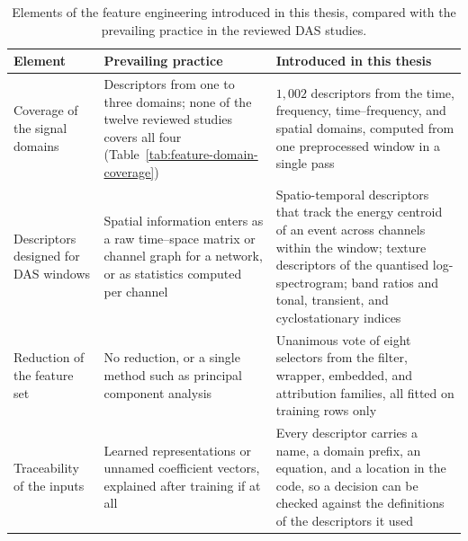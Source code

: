 \begin{table}[!htbp]
	\centering
	\caption{Elements of the feature engineering introduced in this thesis, compared with the prevailing practice in the reviewed DAS studies.}
	\label{tab:novelty}
	\footnotesize
	\setlength{\tabcolsep}{4pt}
	\renewcommand{\arraystretch}{1.2}
	\begin{tabularx}{\textwidth}{@{}>{\raggedright\arraybackslash}p{3.0cm} >{\raggedright\arraybackslash}X >{\raggedright\arraybackslash}X@{}}
		\toprule
		\textbf{Element} & \textbf{Prevailing practice} & \textbf{Introduced in this thesis}\\
		\midrule
		Coverage of the signal domains & Descriptors from one to three domains; none of the twelve reviewed studies covers all four (Table~\ref{tab:feature-domain-coverage}) & $1{,}002$ descriptors from the time, frequency, time--frequency, and spatial domains, computed from one preprocessed window in a single pass\\
		\addlinespace[3pt]
		Descriptors designed for DAS windows & Spatial information enters as a raw time--space matrix or channel graph for a network, or as statistics computed per channel & Spatio-temporal descriptors that track the energy centroid of an event across channels within the window; texture descriptors of the quantised log-spectrogram; band ratios and tonal, transient, and cyclostationary indices\\
		\addlinespace[3pt]
		Reduction of the feature set & No reduction, or a single method such as principal component analysis & Unanimous vote of eight selectors from the filter, wrapper, embedded, and attribution families, all fitted on training rows only\\
		\addlinespace[3pt]
		Traceability of the inputs & Learned representations or unnamed coefficient vectors, explained after training if at all & Every descriptor carries a name, a domain prefix, an equation, and a location in the code, so a decision can be checked against the definitions of the descriptors it used\\
		\bottomrule
	\end{tabularx}
\end{table}


